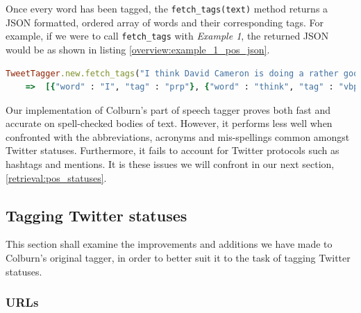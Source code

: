Once every word has been tagged, the \texttt{fetch\_tags(text)} method returns a JSON formatted, ordered array of words and their corresponding tags. For example, if we were to call \texttt{fetch\_tags} with \emph{Example 1}, the returned JSON would be as shown in listing \ref{overview:example_1_pos_json}.

\begin{lstlisting}[language=Ruby, numbers=none, caption={Returned part of speech tags for \emph{Example 1}}, label=overview:example_1_pos_json]
TweetTagger.new.fetch_tags("I think David Cameron is doing a rather good job: strong leader, holding together seemingly impossible coalition, keeping labour at bay")
	=>	[{"word" : "I", "tag" : "prp"}, {"word" : "think", "tag" : "vbp"}, {"word" : "David", "tag" : "nnp"}, {"word" : "Cameron", "tag" : "nnp"}, {"word" : "is", "tag" : "vbz"}, {"word" : "doing", "tag" : "vbg"}, {"word" : "a", "tag" : "det"}, {"word" : "rather", "tag" : "rb"}, {"word" : "good", "tag" : "jj"}, {"word" : "job", "tag" : "nn"}, {"word" : ":", "tag" : "pps"}, {"word" : "strong", "tag" : "jj"}, {"word" : "leader", "tag" : "nn"}, {"word" : ",", "tag" : "ppc"}, {"word" : "holding", "tag" : "vbg"}, {"word" : "together", "tag" : "rb"}, {"word" : "seemingly", "tag" : "rb"}, {"word" : "impossible", "tag" : "jj"}, {"word" : "coalition", "tag" : "nn"}, {"word" : ",", "tag" : "ppc"}, {"word" : "keeping", "tag" : "vbg"}, {"word" : "labour", "tag" : "nn"}, {"word" : "at", "tag" : "in"}, {"word" : "bay", "tag" : "nn"}]
\end{lstlisting}

Our implementation of Colburn's part of speech tagger proves both fast and accurate on spell-checked bodies of text. However, it performs less well when confronted with the abbreviations, acronyms and mis-spellings common amongst Twitter statuses. Furthermore, it fails to account for Twitter protocols such as hashtags and mentions. It is these issues we will confront in our next section, \ref{retrieval:pos_statuses}.

\subsection{Tagging Twitter statuses}
\label{subjectivity:statuses}

This section shall examine the improvements and additions we have made to Colburn's original tagger, in order to better suit it to the task of tagging Twitter statuses.

\subsubsection{URLs}
\label{subjectivity:urls}

